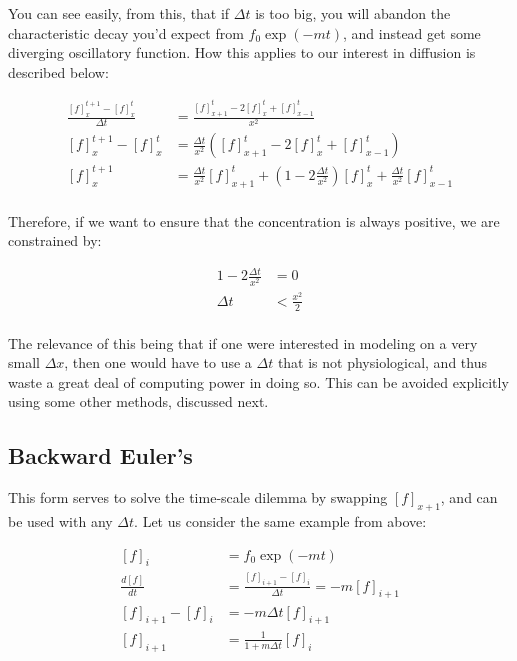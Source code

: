 \documentclass[12pt]{report}
\newcommand{\pr}[1]{\left(#1\right)}
\begin{document}
You can see easily, from this, that if $\Delta t$ is too big, you will abandon the characteristic decay you'd expect from $f_0\exp(-mt)$, and instead get some diverging oscillatory function. How this applies to our interest in diffusion is described below: 

\begin{equation} \label{diff3}
\begin{split}
\frac{[f]^{t+1}_{x} - [f]^{t}_{x}}{\Delta t} &= \frac{[f]^{t}_{x+1} - 2[f]^{t}_x + [f]^{t}_{x - 1}}{x^2}\\
[f]^{t+1}_{x} - [f]^{t}_{x} &= \frac{\Delta t}{x^2} \pr{[f]^{t}_{x+1} - 2[f]^{t}_x + [f]^{t}_{x - 1}} \\
[f]^{t+1}_{x} &= \frac{\Delta t}{x^2} [f]^{t}_{x+1} + \pr{1 - 2\frac{\Delta t}{x^2}}[f]^{t}_x + \frac{\Delta t}{x^2}[f]^{t}_{x - 1} \\
\end{split}
\end{equation}

Therefore, if we want to ensure that the concentration is always positive, we are constrained by: 

\begin{equation} \label{diff4}
\begin{split}
1 - 2\frac{\Delta t}{x^2} & = 0\\
\Delta t & < \frac{x^2}{2}\\
\end{split}
\end{equation}

The relevance of this being that if one were interested in modeling on a very small $\Delta x$, then one would have to use a $\Delta t$ that is not physiological, and thus waste a great deal of computing power in doing so. This can be avoided explicitly using some other methods, discussed next. 

\subsection{Backward Euler's} This form serves to solve the time-scale dilemma by swapping $[f]_{x+1}$, and can be used with any $\Delta t$. Let us consider the same example from above: 

\begin{equation} \label{diff5}
\begin{split}
[f]_i & = f_0\exp(-mt) \\
\frac{d[f]}{dt} & = \frac{[f]_{i+1} - [f]_{i}}{\Delta t} = -m[f]_{i+1} \\
[f]_{i+1} - [f]_{i} & = -m\Delta t[f]_{i+1} \\
[f]_{i+1} & = \frac{1}{1+m\Delta t}[f]_{i} \\
\end{split}
\end{equation}
\end{document}
